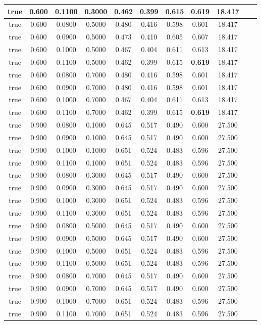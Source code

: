 \documentclass{article}
\begin{document}
\begin{longtable}[c]{|c|c|c|c|c|c|c|c|c|c|c|}
 true & 0.600 & 0.1100 & 0.3000 & 0.462 & 0.399 & 0.615 & \cellcolor{gray!20} \textbf{0.619} & 18.417  \\ \hline 
 true & 0.600 & 0.0800 & 0.5000 & 0.480 & 0.416 & 0.598 & 0.601 & 18.417  \\ \hline 
 true & 0.600 & 0.0900 & 0.5000 & 0.473 & 0.410 & 0.605 & 0.607 & 18.417  \\ \hline 
 true & 0.600 & 0.1000 & 0.5000 & 0.467 & 0.404 & 0.611 & 0.613 & 18.417  \\ \hline 
 true & 0.600 & 0.1100 & 0.5000 & 0.462 & 0.399 & 0.615 & \cellcolor{gray!20} \textbf{0.619} & 18.417  \\ \hline 
 true & 0.600 & 0.0800 & 0.7000 & 0.480 & 0.416 & 0.598 & 0.601 & 18.417  \\ \hline 
 true & 0.600 & 0.0900 & 0.7000 & 0.480 & 0.416 & 0.598 & 0.601 & 18.417  \\ \hline 
 true & 0.600 & 0.1000 & 0.7000 & 0.467 & 0.404 & 0.611 & 0.613 & 18.417  \\ \hline 
 true & 0.600 & 0.1100 & 0.7000 & 0.462 & 0.399 & 0.615 & \cellcolor{gray!20} \textbf{0.619} & 18.417  \\ \hline 
 true & 0.900 & 0.0800 & 0.1000 & 0.645 & 0.517 & 0.490 & 0.600 & 27.500  \\ \hline 
 true & 0.900 & 0.0900 & 0.1000 & 0.645 & 0.517 & 0.490 & 0.600 & 27.500  \\ \hline 
 true & 0.900 & 0.1000 & 0.1000 & 0.651 & 0.524 & 0.483 & 0.596 & 27.500  \\ \hline 
 true & 0.900 & 0.1100 & 0.1000 & 0.651 & 0.524 & 0.483 & 0.596 & 27.500  \\ \hline 
 true & 0.900 & 0.0800 & 0.3000 & 0.645 & 0.517 & 0.490 & 0.600 & 27.500  \\ \hline 
 true & 0.900 & 0.0900 & 0.3000 & 0.645 & 0.517 & 0.490 & 0.600 & 27.500  \\ \hline 
 true & 0.900 & 0.1000 & 0.3000 & 0.651 & 0.524 & 0.483 & 0.596 & 27.500  \\ \hline 
 true & 0.900 & 0.1100 & 0.3000 & 0.651 & 0.524 & 0.483 & 0.596 & 27.500  \\ \hline 
 true & 0.900 & 0.0800 & 0.5000 & 0.645 & 0.517 & 0.490 & 0.600 & 27.500  \\ \hline 
 true & 0.900 & 0.0900 & 0.5000 & 0.645 & 0.517 & 0.490 & 0.600 & 27.500  \\ \hline 
 true & 0.900 & 0.1000 & 0.5000 & 0.651 & 0.524 & 0.483 & 0.596 & 27.500  \\ \hline 
 true & 0.900 & 0.1100 & 0.5000 & 0.651 & 0.524 & 0.483 & 0.596 & 27.500  \\ \hline 
 true & 0.900 & 0.0800 & 0.7000 & 0.645 & 0.517 & 0.490 & 0.600 & 27.500  \\ \hline 
 true & 0.900 & 0.0900 & 0.7000 & 0.645 & 0.517 & 0.490 & 0.600 & 27.500  \\ \hline 
 true & 0.900 & 0.1000 & 0.7000 & 0.651 & 0.524 & 0.483 & 0.596 & 27.500  \\ \hline 
 true & 0.900 & 0.1100 & 0.7000 & 0.651 & 0.524 & 0.483 & 0.596 & 27.500  \\ \hline 
 \end{longtable} 
\end{document}
